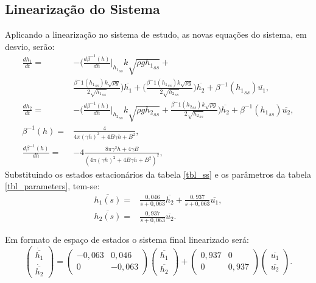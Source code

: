 \subsection{Linearização do Sistema}

Aplicando a linearização no sistema de estudo, as novas equações do sistema, em desvio, serão:
\begin{align}
\nonumber \frac{dh_1}{dt} = &-\big(\frac{d\beta^{-1}(h)}{dh}\bigg|_{{h_1}_{ss}} k\sqrt{\rho g {h_1}_{ss}} + \\
&\frac{\beta^-1({h_1}_{ss}) k\sqrt{\rho g}}{2\sqrt{{h_1}_{ss}}}\big)\overline{h_1} + \big(\frac{\beta^-1({h_1}_{ss}) k\sqrt{\rho g}}{2\sqrt{{h_2}_{ss}}}\big)\overline{h_2} +  \beta^{-1}({h_1}_{ss})\overline{u_1}, \\
\frac{dh_2}{dt} = &-\big(\frac{d\beta^{-1}(h)}{dh}\bigg|_{{h_2}_{ss}} k\sqrt{\rho g {h_2}_{ss}} + \frac{\beta^-1({h_2}_{ss}) k\sqrt{\rho g}}{2\sqrt{{h_2}_{ss}}}\big)\overline{h_2} + \beta^{-1}({h_1}_{ss})\overline{u_2}, \\
\beta^{-1}(h) = &\frac{4}{4\pi(\gamma h)^2 + 4B\gamma h + B^2}, \\
\frac{d\beta^{-1}(h)}{dh} = &-4 \frac{8 \pi \gamma^2 h + 4 \gamma B}{(4\pi(\gamma h)^2 + 4B\gamma h + B^2)^2},
\end{align}
Substituindo os estados estacionários da tabela \ref{tbl_ss} e os parâmetros da tabela \ref{tbl_parameters}, tem-se:
\begin{align}
\overline{h_1(s)} = & \frac{0,046}{s + 0,063}\overline{h_2} + \frac{0,937}{s + 0,063}\overline{u_1}, \\
\overline{h_2(s)} = & \frac{0,937}{s + 0,063}\overline{u_2}.
\end{align}

Em formato de espaço de estados o sistema final linearizado será:
\begin{equation}
\begin{pmatrix} \dot{\overline{h_1}} \\ \dot{\overline{h_2}} \end{pmatrix} = \begin{pmatrix} -0,063 & 0,046 \\ 0 & -0,063 \end{pmatrix} \begin{pmatrix} \overline{h_1} \\ \overline{h_2} \end{pmatrix} + \begin{pmatrix} 0,937 & 0 \\ 0 & 0,937 \end{pmatrix} \begin{pmatrix} \overline{u_1} \\ \overline{u_2} \end{pmatrix}.
\label{espaco_estados}
\end{equation}


